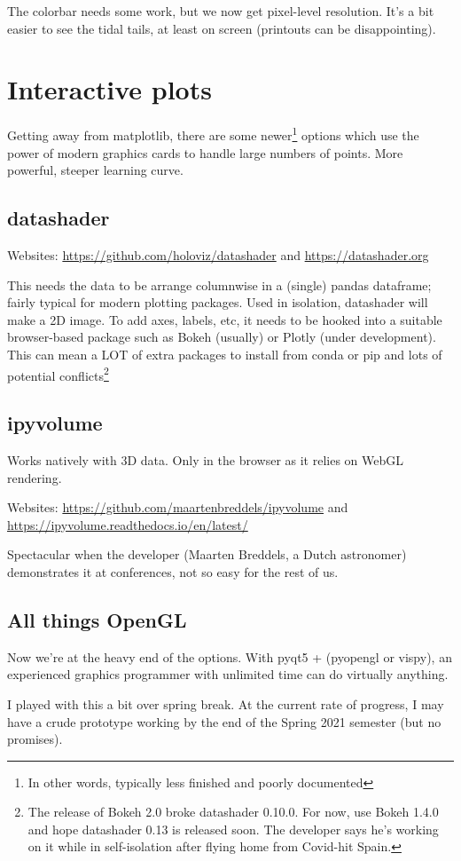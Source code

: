 The colorbar needs some work, but we now get pixel-level resolution. It's a bit easier to see the tidal tails, at least on screen (printouts can be disappointing).

\section{Interactive plots}

Getting away from matplotlib, there are some newer\footnote{In other words, typically less finished and poorly documented} options which use the power of modern graphics cards to handle large numbers of points. More powerful, steeper learning curve.

\subsection{datashader}

Websites: \url{https://github.com/holoviz/datashader} and \url{https://datashader.org}

This needs the data to be arrange columnwise in a (single) pandas dataframe; fairly typical for modern plotting packages. Used in isolation, datashader will make a 2D image. To add axes, labels, etc, it needs to be hooked into a suitable browser-based package such as Bokeh (usually) or Plotly (under development). This can mean a LOT of extra packages to install from conda or pip and lots of potential conflicts\footnote{The release of Bokeh 2.0 broke datashader 0.10.0. For now, use Bokeh 1.4.0 and hope datashader 0.13 is released soon. The developer says he's working on it while in self-isolation after flying home from Covid-hit Spain.}


\subsection{ipyvolume}

Works natively with 3D data. Only in the browser as it relies on WebGL rendering.

Websites: \url{https://github.com/maartenbreddels/ipyvolume} and  \url{https://ipyvolume.readthedocs.io/en/latest/}

Spectacular when the developer (Maarten Breddels, a Dutch astronomer) demonstrates it at conferences, not so easy for the rest of us.

\subsection{All things OpenGL}

Now we're at the heavy end of the options. With pyqt5 + (pyopengl or vispy), an experienced graphics programmer with unlimited time can do virtually anything.

I played with this a bit over spring break. At the current rate of progress, I may have a crude prototype working by the end of the Spring 2021 semester (but no promises).


